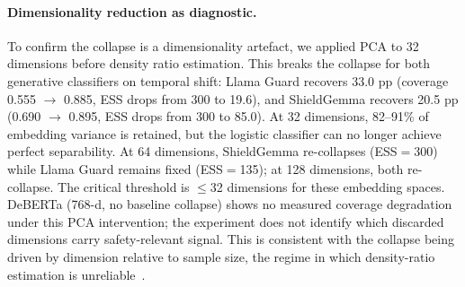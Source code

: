 \documentclass{article}
\begin{document}
\paragraph{Dimensionality reduction as diagnostic.} To confirm the collapse is a dimensionality artefact, we applied PCA to 32 dimensions before density ratio estimation. This breaks the collapse for both generative classifiers on temporal shift: Llama Guard recovers 33.0 pp (coverage 0.555 $\rightarrow$ 0.885, ESS drops from 300 to 19.6), and ShieldGemma recovers 20.5 pp (0.690 $\rightarrow$ 0.895, ESS drops from 300 to 85.0). At 32 dimensions, 82--91\% of embedding variance is retained, but the logistic classifier can no longer achieve perfect separability. At 64 dimensions, ShieldGemma re-collapses (ESS${=}$300) while Llama Guard remains fixed (ESS${=}$135); at 128 dimensions, both re-collapse. The critical threshold is ${\leq}$32 dimensions for these embedding spaces. DeBERTa (768-d, no baseline collapse) shows no measured coverage degradation under this PCA intervention; the experiment does not identify which discarded dimensions carry safety-relevant signal. This is consistent with the collapse being driven by dimension relative to sample size, the regime in which density-ratio estimation is unreliable~\citep{stojanov2019lowdim}.
\end{document}
